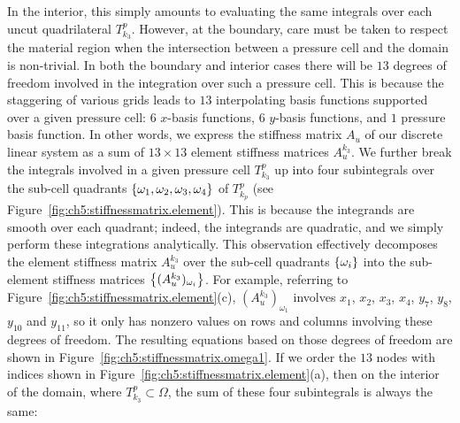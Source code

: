 In the interior, this simply amounts to evaluating the same integrals over each uncut quadrilateral $T^p_{k_3}$. However, at the boundary, care must be taken to respect the material region when the intersection between a pressure cell and the domain is non-trivial. In both the boundary and interior cases there will be $13$ degrees of freedom involved in the integration over such a pressure cell. This is because the staggering of various grids leads to $13$ interpolating basis functions supported over a given pressure cell: $6$ $x$-basis functions, $6$ $y$-basis functions, and $1$ pressure basis function. In other words, we express the stiffness matrix $A_u$ of our discrete linear system as a sum of $13 \times 13$ element stiffness matrices $A_u^{k_3}$. We further break the integrals involved in a given pressure cell $T^p_{k_3}$ up into four subintegrals over the sub-cell quadrants $\left\lbrace \omega_1, \omega_2, \omega_3, \omega_4 \right\rbrace$ of $T^p_{k_p}$ (see Figure~\ref{fig:ch5:stiffnessmatrix.element}). This is because the integrands are smooth over each quadrant; indeed, the integrands are quadratic, and we simply perform these integrations analytically. This observation effectively decomposes the element stiffness matrix $A_u^{k_3}$ over the sub-cell quadrants $\left\lbrace \omega_i \right\rbrace$ into the sub-element stiffness matrices $\left\lbrace (A_u^{k_3})_{\omega_i} \right\rbrace$. For example, referring to Figure~\ref{fig:ch5:stiffnessmatrix.element}(c), $(A_u^{k_3})_{\omega_1}$ involves $x_1$, $x_2$, $x_3$, $x_4$, $y_7$, $y_8$, $y_{10}$ and $y_{11}$, so it only has nonzero values on rows and columns involving these degrees of freedom. The resulting equations based on those degrees of freedom are shown in Figure~\ref{fig:ch5:stiffnessmatrix.omega1}. If we order the $13$ nodes with indices shown in Figure~\ref{fig:ch5:stiffnessmatrix.element}(a), then on the interior of the domain, where $T^p_{k_3} \subset \Omega$, the sum of these four subintegrals is always the same:


